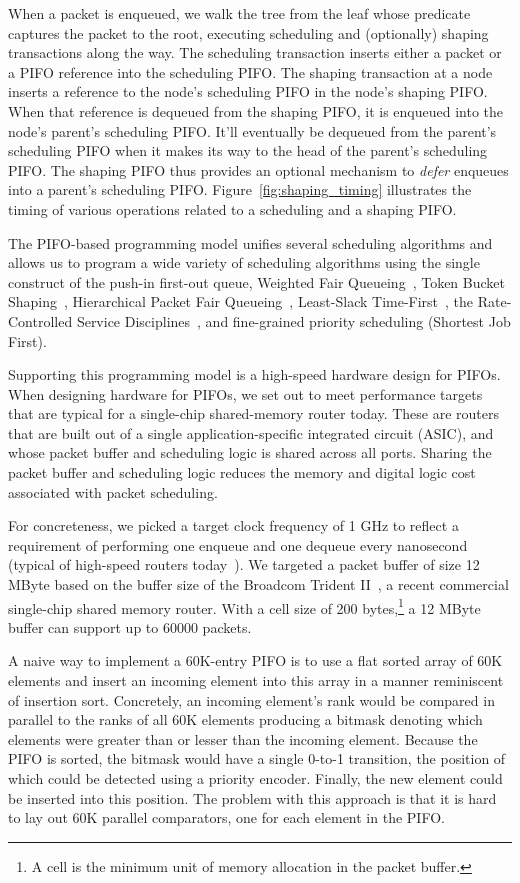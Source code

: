 When a packet is enqueued, we walk the tree from the leaf whose predicate
captures the packet to the root, executing scheduling and (optionally) shaping
transactions along the way. The scheduling transaction inserts either a packet
or a PIFO reference into the scheduling PIFO. The shaping transaction at a node
inserts a reference to the node's scheduling PIFO in the node's shaping PIFO.
When that reference is dequeued from the shaping PIFO, it is enqueued into the
node's parent's scheduling PIFO. It'll eventually be dequeued from the parent's
scheduling PIFO when it makes its way to the head of the parent's scheduling
PIFO. The shaping PIFO thus provides an optional mechanism to {\em defer}
enqueues into a parent's scheduling PIFO. Figure~\ref{fig:shaping_timing}
illustrates the timing of various operations related to a scheduling and a
shaping PIFO.

The PIFO-based programming model unifies several scheduling algorithms and
allows us to program a wide variety of scheduling algorithms using the single
construct of the push-in first-out queue, \eg Weighted Fair
Queueing~\cite{wfq}, Token Bucket Shaping~\cite{tbf}, Hierarchical Packet
Fair Queueing~\cite{hpfq}, Least-Slack Time-First~\cite{lstf}, the
Rate-Controlled Service Disciplines~\cite{rcsd}, and fine-grained priority
scheduling (\eg Shortest Job First).

 Supporting this programming model is a high-speed
hardware design for PIFOs. When designing hardware for PIFOs, we set out to
meet performance targets that are typical for a single-chip shared-memory
router today. These are routers that are built out of a single
application-specific integrated circuit (ASIC), and whose packet buffer and
scheduling logic is shared across all ports. Sharing the packet buffer and
scheduling logic reduces the memory and digital logic cost associated with
packet scheduling.

For concreteness, we picked a target clock frequency of 1 GHz to reflect a
requirement of performing one enqueue and one dequeue every nanosecond (typical
of high-speed routers today~\cite{rmt}). We targeted a packet buffer of size 12
MByte based on the buffer size of the Broadcom Trident
II~\cite{bcom_buffer}, a recent commercial single-chip shared memory
router. With a cell size of 200 bytes,\footnote{A cell is the minimum unit of
memory allocation in the packet buffer.} a 12 MByte buffer can support up to
60000 packets.

A naive way to implement a 60K-entry PIFO is to use a flat sorted array of 60K
elements and insert an incoming element into this array in a manner reminiscent
of insertion sort. Concretely, an incoming element's rank would be compared in
parallel to the ranks of all 60K elements producing a bitmask denoting which
elements were greater than or lesser than the incoming element. Because the
PIFO is sorted, the bitmask would have a single 0-to-1 transition, the position
of which could be detected using a priority encoder. Finally, the new element
could be inserted into this position. The problem with this approach is that it
is hard to lay out 60K parallel comparators, one for each element in the PIFO.

